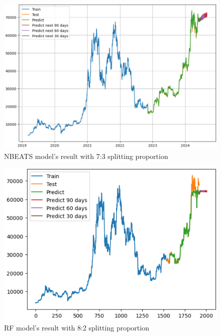 \documentclass{ieeeojies}
\begin{document}
\begin{figure}[H]
	\centering
	\begin{minipage}{0.8\linewidth}
		\centering
		\includegraphics[width=\linewidth]{bibliography/Images/NBEATS_BTC_73.PNG}
		\caption{NBEATS model's result with 7:3 splitting proportion}
	\end{minipage}
\end{figure}
\begin{figure}[H]
	\centering
	\begin{minipage}{0.8\linewidth}
		\centering
		\includegraphics[width=\linewidth]{bibliography/Images/RF_BTC_82.PNG}
		\caption{RF model's result with 8:2 splitting proportion}
	\end{minipage}
\end{figure}
\end{document}
